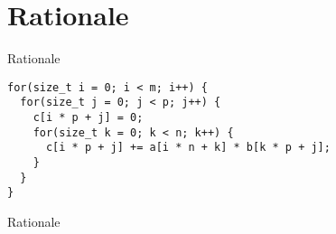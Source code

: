 \section{Rationale}\label{sec:rationale}
\mkAgenda

\begin{frame}[fragile]{Rationale}
    \center
    \begin{verbatim}
for(size_t i = 0; i < m; i++) {
  for(size_t j = 0; j < p; j++) {
    c[i * p + j] = 0;
    for(size_t k = 0; k < n; k++) {
      c[i * p + j] += a[i * n + k] * b[k * p + j];
    }
  }
}
    \end{verbatim}
\end{frame}

\begin{frame}{Rationale}
    \center
\end{frame}
